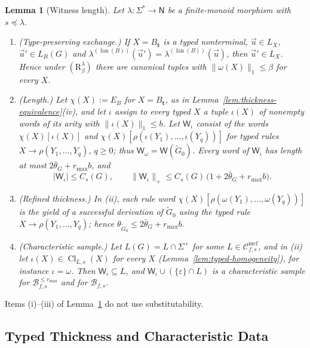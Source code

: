 \documentclass[11pt]{article}
\numberwithin{equation}{section}
\theoremstyle{plain}
\newtheorem{lemma}[theorem]{Lemma}
\theoremstyle{definition}
\theoremstyle{remark}
\newcommand{\Wit}{\mathsf{W}}
\newcommand{\Cmcf}[2]{\mathcal{C}^{\mathrm{mcf}}_{#1,#2}}
\newcommand{\tuple}[1]{\vec{#1}}
\newcommand{\eps}{\varepsilon}
\newcommand{\fan}{\operatorname{fan}}
\theoremstyle{plain}
\begin{document}
\begin{lemma}[Witness length]
\label{lem:witness-length-template}
\label{lem:type-preserving-replacement}
Let $\lambda:\Sigma^*\to\mathsf N$ be a finite-monoid morphism with $s\preceq\lambda$.
\begin{enumerate}[label=\textup{(\roman*)},leftmargin=*]
\item \emph{(Type-preserving exchange.)}  If $X=B_{\mathbf t}$ is a typed
nonterminal, $\tuple u\in L_X$, $\tuple u'\in L_B(G)$ and
$\lambda^{(\fan(B))}(\tuple u')=\lambda^{(\fan(B))}(\tuple u)$, then
$\tuple u'\in L_X$.  Hence under $(\mathrm R_\beta^\lambda)$ there are canonical
tuples with $\|\omega(X)\|_1\le\beta$ for every $X$.
\item \emph{(Length.)}  Let $\chi(X):=E_B$ for $X=B_{\mathbf t}$, as in
Lemma~\ref{lem:thickness-equivalence}(iv), and let $\iota$ assign to every typed $X$ a
tuple $\iota(X)$ of nonempty words of its arity with $\|\iota(X)\|_1\le b$.  Let
$\Wit_\iota$ consist of the words $\chi(X)[\iota(X)]$ and
$\chi(X)[\rho(\iota(Y_1),\ldots,\iota(Y_q))]$ for typed rules
$X\to\rho(Y_1,\ldots,Y_q)$, $q\ge0$; thus $\Wit_\omega=\Wit(\widetilde G_0)$.  Every
word of $\Wit_\iota$ has length at most $2\bar\theta_G+r_{\max}b$, and
\[
 |\Wit_\iota|\le C_s(G),\qquad
 \|\Wit_\iota\|_+\le C_s(G)\,\bigl(1+2\bar\theta_G+r_{\max}b\bigr).
\]
\item \emph{(Refined thickness.)}  In (ii), each rule word
$\chi(X)[\rho(\omega(Y_1),\ldots,\omega(Y_q))]$ is the yield of a successful
derivation of $\widetilde G_0$ using the typed rule
$X\to\rho(Y_1,\ldots,Y_q)$; hence $\theta_{\widetilde G_0}\le2\bar\theta_G+r_{\max}b$.
\item \emph{(Characteristic sample.)}  Let $L(G)=L\cap\Sigma^+$ for some
$L\in\Cmcf{f}{s}$, and in \textup{(ii)} let $\iota(X)\in\operatorname{Cl}_{L,s}(X)$ for every
$X$ (Lemma~\ref{lem:typed-homogeneity}), for instance $\iota=\omega$.  Then
$\Wit_\iota\subseteq L$, and $\Wit_\iota\cup(\{\eps\}\cap L)$ is a characteristic
sample for $\mathcal B^{\le r_{\max}}_{f,s}$ and for $\mathcal B_{f,s}$.
\end{enumerate}
\end{lemma}

Items (i)--(iii) of Lemma~\ref{lem:witness-length-template} do not use
substitutability.

\subsection{Typed Thickness and Characteristic Data}
\label{subsec:typed-thickness}
\end{document}
